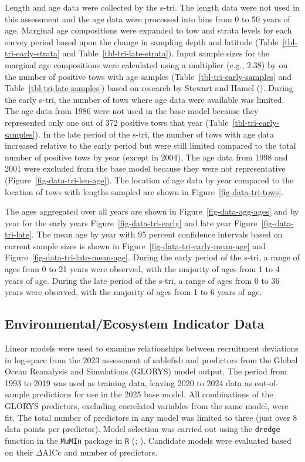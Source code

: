 \documentclass[
  english,
]{article}
\begin{document}
Length and age data were collected by the \gls{s-tri}. The length data
were not used in this assessment and the age data were processed into
bins from 0 to 50 years of age. Marginal age compositions were expanded
to tow and strata levels for each survey period based upon the change in
sampling depth and latitude (Table~\ref{tbl-tri-early-strata} and
Table~\ref{tbl-tri-late-strata}). Input sample sizes for the marginal
age compositions were calculated using a multiplier (e.g., 2.38) by on
the number of positive tows with age samples
(Table~\ref{tbl-tri-early-samples} and Table~\ref{tbl-tri-late-samples})
based on research by Stewart and Hamel
(). During the early
\gls{s-tri}, the number of tows where age data were available was
limited. The age data from 1986 were not used in the base model because
they represented only one out of 372 positive tows that year
(Table~\ref{tbl-tri-early-samples}). In the late period of the
\gls{s-tri}, the number of tows with age data increased relative to the
early period but were still limited compared to the total number of
positive tows by year (except in 2004). The age data from 1998 and 2001
were excluded from the base model because they were not representative
(Figure~\ref{fig-data-tri-len-age}). The location of age data by year
compared to the location of tows with lengths sampled are shown in
Figure~\ref{fig-data-tri-tows}.

The ages aggregated over all years are shown in
Figure~\ref{fig-data-agg-ages} and by year for the early years
Figure~\ref{fig-data-tri-early} and late year
Figure~\ref{fig-data-tri-late}. The mean age by year with 95 percent
confidence intervals based on current sample sizes is shown in
Figure~\ref{fig-data-tri-early-mean-age} and
Figure~\ref{fig-data-tri-late-mean-age}. During the early period of the
\gls{s-tri}, a range of ages from 0 to 21 years were observed, with the
majority of ages from 1 to 4 years of age. During the late period of the
\gls{s-tri}, a range of ages from 0 to 36 years were observed, with the
majority of ages from 1 to 6 years of age.

\subsection{Environmental/Ecosystem Indicator
Data}\label{rec-index-data}

Linear models were used to examine relationships between recruitment
deviations in log-space from the 2023 assessment of sablefish and
predictors from the Global Ocean Reanalysis and Simulations (GLORYS)
model output. The period from 1993 to 2019 was used as training data,
leaving 2020 to 2024 data as out-of-sample predictions for use in the
2025 base model. All combinations of the GLORYS predictors, excluding
correlated variables from the same model, were fit. The total number of
predictors in any model was limited to three (just over 8 data points
per predictor). Model selection was carried out using the
\texttt{dredge} function in the \texttt{MuMIn} package in \texttt{R}
(; ). Candidate models were evaluated based on their
\(\Delta\)AICc and number of predictors.
\end{document}
